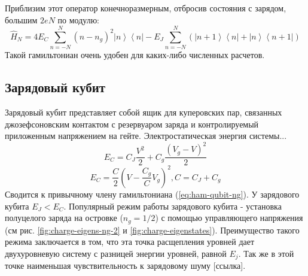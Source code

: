 \documentclass[12pt, twoside]{report}
\numberwithin{equation}{section}
\numberwithin{figure}{section}
\begin{document}
Приблизим этот оператор конечноразмерным, отбросив состояния с зарядом, большим $2 e N$ по модулю: 
\begin{equation}
\hat{H}_N = 4 E_C \sum_{n = -N}^{N}\left(n - n_g\right)^2 \left| n \right>\left< n \right|  -
E_J \sum_{n = -N}^{N}
\left( 
\left| n+1 \right>\left< n   \right| +
\left| n   \right>\left< n+1 \right|
\right)
\label{eq:ham-qubit-charge-basis-N}
\end{equation}
Такой гамильтониан очень удобен для каких-либо численных расчетов. 

\subsection{Зарядовый кубит}
Зарядовый кубит представляет собой ящик для куперовских пар, связанных джозефсоновским контактом с резервуаром заряда и контролируемый приложенным напряжением на гейте. Электростатическая энергия системы...
\begin{equation}
E_C = C_J \frac{V^2}{2} + C_g \frac{\left(V_g-V\right)^2}{2} 
\end{equation}
\begin{equation}
E_C = \frac{C} { 2 } \left(V - \frac{C_g}{C} V_g\right)^2, C = C_J + C_g
\end{equation}
Сводится к привычному члену гамильтониана (\ref{eq:ham-qubit-ng}).
\newline
У зарядового кубита $E_J < E_C$. 
Популярный режим работы зарядового кубита - установка полуцелого заряда на островке ($n_g = 1/2$) с помощью управляющего напряжения (см рис. \ref{fig:charge-eigens-ng-2} и \ref{fig:charge-eigenstates}). Преимущество такого режима заключается в том, что эта точка расщепления уровней дает двухуровневую систему с разницей энергии уровней, равной $E_j$. Так же в этой точке наименьшая чувствительность к зарядовому шуму [ссылка].
\end{document}
